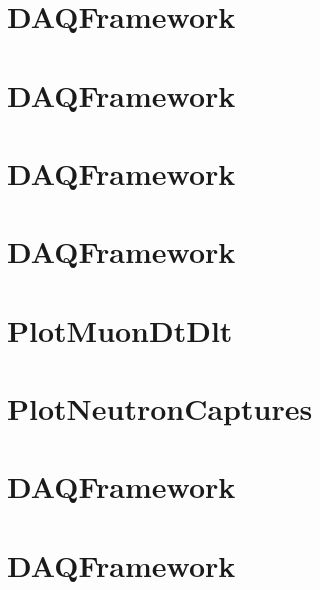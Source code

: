 \let\mypdfximage\pdfximage\def\pdfximage{\immediate\mypdfximage}\documentclass[twoside]{book}
\newcommand{\+}{\discretionary{\mbox{\scriptsize$\hookleftarrow$}}{}{}}
\begin{document}
\chapter{DAQFramework}
\label{md_UserTools_NCaptInfo_README}

\chapter{DAQFramework}
\label{md_UserTools_NeutCloudCorrelationCuts_README}

\chapter{DAQFramework}
\label{md_UserTools_ntag_BDT_README}

\chapter{DAQFramework}
\label{md_UserTools_PlotHitTimes_README}

\chapter{Plot\+Muon\+Dt\+Dlt}
\label{md_UserTools_PlotMuonDtDlt_README}

\chapter{Plot\+Neutron\+Captures}
\label{md_UserTools_PlotNeutronCaptures_README}

\chapter{DAQFramework}
\label{md_UserTools_PositronIdentificationCuts_README}

\chapter{DAQFramework}
\label{md_UserTools_PostLoweReconstructionCuts_README}

\end{document}
